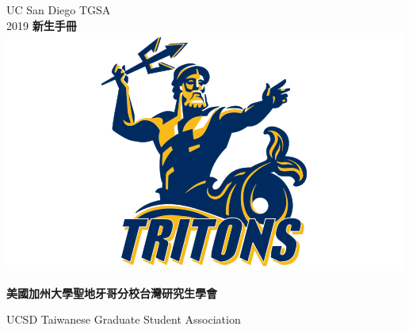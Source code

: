 \documentclass[12pt,a4paper]{book}
\begin{document}
\begin{titlepage}
\clearpage
\vspace*{\fill}
\begin{minipage}{\textwidth}

\begin{center}
\fontsize{40}{55}\selectfont 
UC San Diego TGSA \\[2mm] 2019 \textbf{新生手冊}
\vspace{3cm}\\ 
\includegraphics[width=\textwidth]{img/triton}\\ 
\vspace{3cm}

\fontsize{20}{30}\selectfont 
\textbf{美國加州大學聖地牙哥分校台灣研究生學會}\\ 
\vspace{0.2cm}

\fontsize{18.5}{30}\selectfont 
UCSD Taiwanese Graduate Student Association
\end{center}

\end{minipage}
\vfill
\clearpage
\end{titlepage}
\end{document}
